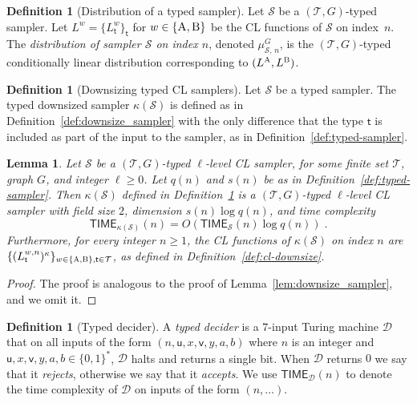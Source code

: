 \documentclass[11pt]{article}
\newtheorem{lemma}[theorem]{Lemma}
\theoremstyle{definition}
\newtheorem{definition}[theorem]{Definition}
\newcommand{\downsize}{\kappa}
\newcommand{\sampler}{\mathcal{S}}
\newcommand{\decider}{\mathcal{D}}
\newcommand{\type}{\mathcal{T}}
\newcommand{\labelstyle}[1]{\ensuremath{\textsc{#1}}\xspace}
\newcommand{\tvarstyle}[1]{\mathsf{#1}}
\newcommand{\tvar}{\ensuremath{\tvarstyle{t}}}
\newcommand{\lvar}{\ensuremath{\tvarstyle{u}}}
\newcommand{\rvar}{\ensuremath{\tvarstyle{v}}}
\newcommand{\alice}{\labelstyle{A}}
\newcommand{\bob}{\labelstyle{B}}
\newcommand{\TIME}{\mathsf{TIME}}
\begin{document}
\begin{definition}[Distribution of a typed sampler]
  \label{def:typed-sampler-sample}
  Let $\sampler$ be a $(\type, G)$-typed sampler.
  Let $L^w = \{ L^{w}_{\tvar} \}_\tvar$ for $w\in \{\alice, \bob\}$ be the CL
  functions of $\sampler$ on index~$n$.
  The \emph{distribution of sampler $\sampler$ on index $n$},
  denoted $\mu^G_{\sampler,\, n}$, is the $(\type, G)$-typed conditionally
  linear distribution corresponding to $(L^\alice, L^\bob)$.
\end{definition}

\begin{definition}[Downsizing typed CL samplers]
  \label{def:downsize-typed-sampler}
Let $\sampler$ be a typed sampler.
  The typed downsized sampler $\downsize(\sampler)$ is defined as in
  Definition~\ref{def:downsize_sampler} with the only difference that the type
  $\tvar$ is included as part of the input to the sampler, as in
  Definition~\ref{def:typed-sampler}.
\end{definition}

\begin{lemma}
  \label{lem:downsize_typed_sampler}
Let $\sampler$ be a $(\type, G)$-typed $\ell$-level CL sampler, for some finite set
  $\type$, graph $G$,  and integer $\ell\geq 0$.
  Let $q(n)$ and $s(n)$ be as in Definition~\ref{def:typed-sampler}.
  Then $\downsize(\sampler)$ defined in
  Definition~\ref{def:downsize-typed-sampler} is a $(\type, G)$-typed $\ell$-level CL
  sampler with field size $2$, dimension $s(n) \log q(n)$, and
  time complexity
  \begin{equation*}
    \TIME_{\downsize(\sampler)}(n) = O(\TIME_\sampler(n) \log q(n))\;.
  \end{equation*}
  Furthermore, for every integer $n \geq 1$, the CL functions of
  $\downsize(\sampler)$ on index $n$ are
  $\{(L_\tvar^{w,n})^\downsize\}_{w\in\{\alice,\bob\}, \tvar\in\type}$, as
  defined in Definition~\ref{def:cl-downsize}.
\end{lemma}

\begin{proof}
  The proof is analogous to the proof of Lemma~\ref{lem:downsize_sampler}, and
  we omit it.
\end{proof}

\begin{definition}[Typed decider]
  \label{def:typed-decider}
  A \emph{typed decider} is a $7$-input Turing machine $\decider$ that on all
  inputs of the form $(n,\lvar,x,\rvar,y,a,b)$ where $n$ is an integer and
  $\lvar,x,\rvar,y,a,b \in \{0,1\}^*$, $\decider$ halts and returns a single
  bit.
  When $\decider$ returns $0$ we say that it \emph{rejects}, otherwise we say
  that it \emph{accepts}.
  We use $\TIME_\decider(n)$ to denote the time complexity of $\decider$ on
  inputs of the form $(n,\ldots)$.
\end{definition}
\end{document}
